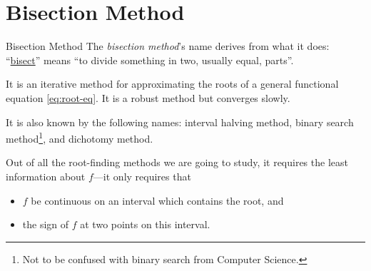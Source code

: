 \documentclass[12pt,aspectratio=169,envcountset]{beamer}
\begin{document}
\section{Bisection Method}
\begin{frame}{Bisection Method}
  The \emph{bisection method}'s name derives from what it does:
  ``\href{https://dictionary.cambridge.org/dictionary/english/bisect}{bisect}''
  means ``to divide something in two, usually equal, parts''.

  It is an iterative method for approximating the roots of a general functional
  equation \eqref{eq:root-eq}.
  It is a robust method but converges slowly.

  It is also known by the following names: interval halving method, binary
  search method\footnote{Not to be confused with binary search from Computer
  Science.}, and dichotomy method.

  Out of all the root-finding methods we are going to study, it requires the
  least information about $f$---it only requires that 
  \begin{itemize}
    \item $f$ be continuous on an interval which contains the root, and
    \item the sign of $f$ at two points on this interval.
  \end{itemize}
\end{frame}
\end{document}
